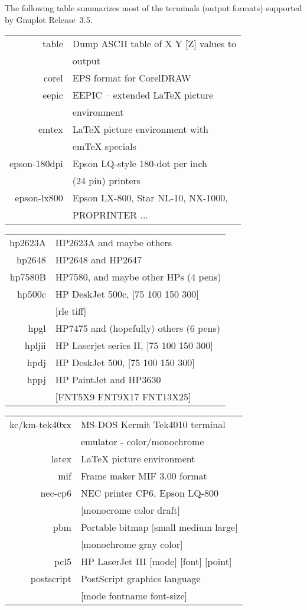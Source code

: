 \documentclass[aps,twocolumn,a4]{revtex4}
\begin{document}
The following table  summarizes most of the terminals
(output formats) supported by Gnuplot Release~3.5.
\begin{tabular}{r l}
            table & Dump ASCII table of X Y [Z] values to \\
                  & output\\
            corel & EPS format for CorelDRAW\\
            eepic & EEPIC -- extended LaTeX picture \\
                  & environment\\
            emtex & LaTeX picture environment with \\
                  & emTeX specials\\
     epson-180dpi & Epson LQ-style 180-dot per inch \\
                  & (24 pin) printers\\
      epson-lx800 & Epson LX-800, Star NL-10, NX-1000, \\
                  & PROPRINTER ...\\
\end{tabular}
\begin{tabular}{r l}
          hp2623A & HP2623A and maybe others\\
           hp2648 & HP2648 and HP2647\\
          hp7580B & HP7580, and maybe other HPs (4 pens)\\
           hp500c & HP DeskJet 500c, [75 100 150 300] \\
                  & [rle tiff]\\
             hpgl & HP7475 and (hopefully) others (6 pens)\\
           hpljii & HP Laserjet series II, [75 100 150 300]\\
             hpdj & HP DeskJet 500, [75 100 150 300]\\
             hppj & HP PaintJet and HP3630 \\
                  & [FNT5X9 FNT9X17 FNT13X25]\\
\end{tabular}
\begin{tabular}{r l}
    kc/km-tek40xx & MS-DOS Kermit Tek4010 terminal \\
                  & emulator - color/monochrome\\
            latex & LaTeX picture environment\\
              mif & Frame maker MIF 3.00 format\\
          nec-cp6 & NEC printer CP6, Epson LQ-800 \\
                  & [monocrome color draft]\\
              pbm & Portable bitmap [small medium large] \\
                  & [monochrome gray color]\\
             pcl5 & HP LaserJet III [mode] [font] [point]\\
       postscript & PostScript graphics language \\
                  & [mode fontname font-size]\\
\end{tabular}
\end{document}
